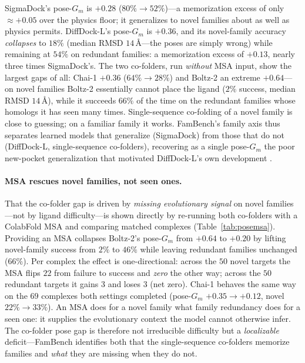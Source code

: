 \documentclass[11pt]{article}
\begin{document}
SigmaDock's pose-$G_m$ is $+0.28$ ($80\%\to52\%$)---a memorization excess of only $\approx +0.05$
over the physics floor; it generalizes to novel families about as well as physics permits.
DiffDock-L's pose-$G_m$ is $+0.36$, and its novel-family accuracy \emph{collapses} to $18\%$ (median
RMSD $14$\,\AA---the poses are simply wrong) while remaining at $54\%$ on redundant families: a
memorization excess of $+0.13$, nearly three times SigmaDock's. The two co-folders, run \emph{without}
MSA input, show the largest gaps of all: Chai-1 $+0.36$ ($64\%\to28\%$) and Boltz-2 an extreme
$+0.64$---on novel families Boltz-2 essentially cannot place the ligand ($2\%$ success, median RMSD
$14$\,\AA), while it succeeds $66\%$ of the time on the redundant families whose homologs it has seen
many times. Single-sequence co-folding of a novel family is close to guessing; on a familiar family
it works. FamBench's family axis thus separates learned models that generalize (SigmaDock) from those
that do not (DiffDock-L, single-sequence co-folders), recovering as a single pose-$G_m$ the poor
new-pocket generalization that motivated DiffDock-L's own development \citep{corso2024diffdockl}.

\paragraph{MSA rescues novel families, not seen ones.} That the co-folder gap is driven by
\emph{missing evolutionary signal} on novel families---not by ligand difficulty---is shown directly
by re-running both co-folders with a ColabFold MSA and comparing matched complexes
(Table~\ref{tab:posemsa}). Providing an MSA collapses Boltz-2's pose-$G_m$ from $+0.64$ to $+0.20$ by
lifting novel-family success from $2\%$ to $46\%$ while leaving redundant families unchanged ($66\%$).
Per complex the effect is one-directional: across the $50$ novel targets the MSA flips $22$ from
failure to success and \emph{zero} the other way; across the $50$ redundant targets it gains $3$ and
loses $3$ (net zero). Chai-1 behaves the same way on the $69$ complexes both settings completed
(pose-$G_m$ $+0.35\to+0.12$, novel $22\%\to33\%$). An MSA does for a novel family what family
redundancy does for a seen one: it supplies the evolutionary context the model cannot otherwise
infer. The co-folder pose gap is therefore not irreducible difficulty but a \emph{localizable}
deficit---FamBench identifies both that the single-sequence co-folders memorize families and
\emph{what} they are missing when they do not.
\end{document}
